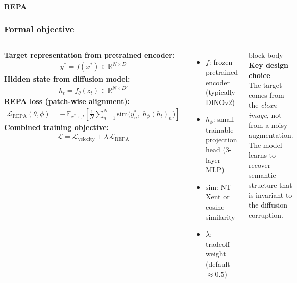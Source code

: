 \begin{frame}[t]
  \framesubtitle{REPA}
  \frametitle{Formal objective}
  \begin{columns}[T,totalwidth=\textwidth]
    \textbf{Target representation from pretrained encoder:}
    \begin{align*}
      y^\ast = f(x^\ast) \in \mathbb{R}^{N \times D}
    \end{align*}
    \textbf{Hidden state from diffusion model:}
    \begin{align*}
      h_t = f_\theta(z_t) \in \mathbb{R}^{N \times D'}
    \end{align*}
    \textbf{REPA loss (patch-wise alignment):}
    \begin{align*}
      \mathcal{L}_{\text{REPA}}(\theta, \phi)
      = -\,\mathbb{E}_{x^\ast,\epsilon,t}\!\left[
        \frac{1}{N}\sum_{n=1}^{N}
        \mathrm{sim}\!\bigl(y_n^\ast,\;h_\phi(h_t)_n\bigr)
      \right]
    \end{align*}
    \textbf{Combined training objective:}
    \begin{align*}
      \boxed{\;\mathcal{L} = \mathcal{L}_{\text{velocity}}
        + \lambda\,\mathcal{L}_{\text{REPA}}\;}
    \end{align*}
    \vspace{0.08cm}
    \begin{itemize}
      \item \(f\): frozen pretrained encoder (typically DINOv2)
      \item \(h_\phi\): small trainable projection head (3-layer MLP)
      \item \(\mathrm{sim}\): NT-Xent or cosine similarity
      \item \(\lambda\): tradeoff weight (default \(\approx 0.5\))
    \end{itemize}
    \begin{beamercolorbox}[wd=\linewidth,rounded=true,sep=0.20cm]{block body}
      \textbf{Key design choice}\\[4pt]
      The target comes from the \emph{clean image}, not from a noisy
      augmentation. The model learns to recover semantic structure
      that is invariant to the diffusion corruption.
    \end{beamercolorbox}
    \vspace{0.18cm}

\end{columns}
\end{frame}
